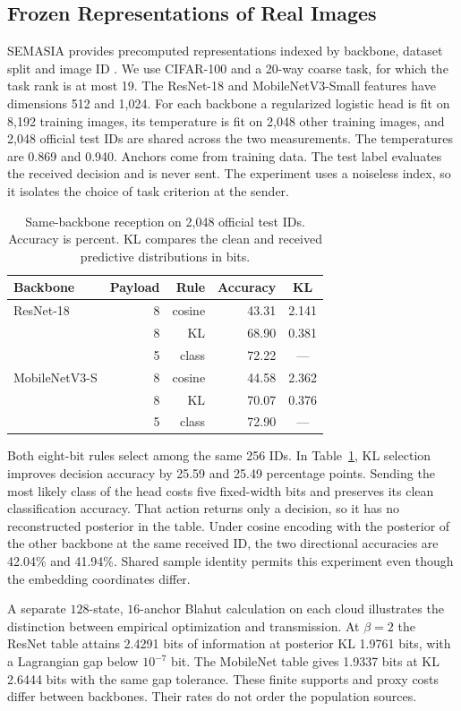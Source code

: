 \documentclass[10pt,journal]{IEEEtran}
\begin{document}
\subsection{Frozen Representations of Real Images}
SEMASIA provides precomputed representations indexed by backbone, dataset split and image ID \cite{pandolfo2026semasialargescaledatasetsemantically}. We use CIFAR-100 and a 20-way coarse task, for which the task rank is at most 19. The ResNet-18 and MobileNetV3-Small features have dimensions 512 and 1,024. For each backbone a regularized logistic head is fit on 8,192 training images, its temperature is fit on 2,048 other training images, and 2,048 official test IDs are shared across the two measurements. The temperatures are 0.869 and 0.940. Anchors come from training data. The test label evaluates the received decision and is never sent. The experiment uses a noiseless index, so it isolates the choice of task criterion at the sender.
\begin{table}[t]
\caption{Same-backbone reception on 2,048 official test IDs. Accuracy is percent. KL compares the clean and received predictive distributions in bits.}\label{tab:real}\centering
\begin{tabular}{lrrrc}\toprule
Backbone & Payload & Rule & Accuracy & KL\\\midrule
ResNet-18 & 8 & cosine & 43.31 & 2.141\\
          & 8 & KL     & 68.90 & 0.381\\
          & 5 & class  & 72.22 & ---\\
MobileNetV3-S & 8 & cosine & 44.58 & 2.362\\
              & 8 & KL & 70.07 & 0.376\\
              & 5 & class & 72.90 & ---\\\bottomrule
\end{tabular}\end{table}
Both eight-bit rules select among the same 256 IDs. In Table~\ref{tab:real}, KL selection improves decision accuracy by 25.59 and 25.49 percentage points. Sending the most likely class of the head costs five fixed-width bits and preserves its clean classification accuracy. That action returns only a decision, so it has no reconstructed posterior in the table. Under cosine encoding with the posterior of the other backbone at the same received ID, the two directional accuracies are 42.04\% and 41.94\%. Shared sample identity permits this experiment even though the embedding coordinates differ.

A separate $128$-state, $16$-anchor Blahut calculation on each cloud illustrates the distinction between empirical optimization and transmission. At $\beta=2$ the ResNet table attains 2.4291 bits of information at posterior KL 1.9761 bits, with a Lagrangian gap below $10^{-7}$ bit. The MobileNet table gives 1.9337 bits at KL 2.6444 bits with the same gap tolerance. These finite supports and proxy costs differ between backbones. Their rates do not order the population sources.
\end{document}
